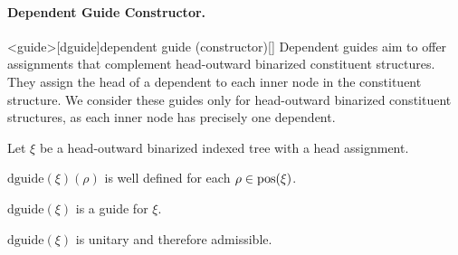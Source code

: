 \documentclass[../../document.tex]{subfiles}
\begin{document}
    \paragraph{Dependent Guide Constructor.}<guide>[dguide]{dependent guide (constructor)}[]
    Dependent guides aim to offer assignments that complement head-outward binarized constituent structures.
    They assign the head of a dependent to each inner node in the constituent structure.
    We consider these guides only for head-outward binarized constituent structures, as each inner node has precisely one dependent.

    \begin{claim}
        Let \(\xi\) be a head-outward binarized indexed tree with a head assignment.
        \begin{compactenum}
            \item \(\mathrm{dguide}(\xi)(\rho)\) is well defined for each \(\rho \in \operatorname{pos}(\xi)\).
            \item \(\mathrm{dguide}(\xi)\) is a guide for \(\xi\).
            \item \(\mathrm{dguide}(\xi)\) is unitary and therefore admissible.
        \end{compactenum}
    \end{claim}
\end{document}
